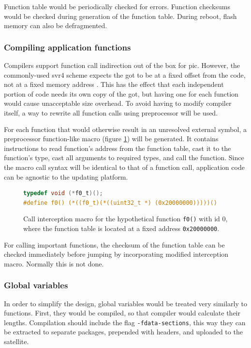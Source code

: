 Function table would be periodically checked for errors. Function checksums would be checked during generation of the function table. During reboot, flash memory can also be defragmented.

\subsubsection{Compiling application functions}

Compilers support function call indirection out of the box for \gls{pic}. However, the commonly-used \gls{svr4} scheme expects the \gls{got} to be at a fixed offset from the code, not at a fixed memory address \cite[Chapter~8]{Levine1999}. This has the effect that each independent portion of code needs its own copy of the \gls{got}, but having one for each function would cause unacceptable size overhead. To avoid having to modify compiler itself, a way to rewrite all function calls using preprocessor will be used.

For each function that would otherwise result in an unresolved external symbol, a preprocessor function-like macro (figure \ref{fig:macro}) will be generated. It contains instructions to read function's address from the function table, cast it to the function's type, cast all arguments to required types, and call the function. Since the macro call syntax will be identical to that of a function call, application code can be agnostic to the updating platform.

\begin{figure} [htb]
\begin{lstlisting}[language=C]
typedef void (*f0_t)();
#define f0() (*((f0_t)(*((uint32_t *) (0x20000000)))))()
\end{lstlisting}
\caption{Call interception macro for the hypothetical function \texttt{f0()} with id $0$, \\where the function table is located at a fixed address \texttt{0x20000000}.}
\label{fig:macro}
\end{figure}

For calling important functions, the checksum of the function table can be checked immediately before jumping by incorporating modified interception macro. Normally this is not done.

\subsubsection{Global variables}

In order to simplify the design, global variables would be treated very similarly to functions. First, they would be compiled, so that compiler would calculate their lengths. Compilation should include the flag \texttt{-fdata-sections}, this way they can be extracted to separate packages, prepended with headers, and uploaded to the satellite.

